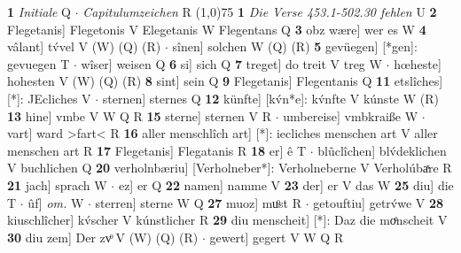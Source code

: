 \documentclass[8pt,a4paper,notitlepage]{article}
\begin{document}
\begin{table}[ht]
\begin{minipage}[t]{0.5\linewidth}
\textbf{1} \textit{Initiale} Q   $\cdot$ \textit{Capitulumzeichen} R  \newline
\line(1,0){75} \newline
\textbf{1} \textit{Die Verse 453.1-502.30 fehlen} U  \textbf{2} Flegetanis] Flegetonis V Elegetanis W Flegentans Q \textbf{3} obz wære] wer es W \textbf{4} vâlant] tv́vel V (W) (Q) (R)  $\cdot$ sînen] solchen W (Q) (R) \textbf{5} gevüegen] [*gen]: gevuegen T  $\cdot$ wîser] weisen Q \textbf{6} si] sich Q \textbf{7} treget] do treit V treg W  $\cdot$ hœheste] hohesten V (W) (Q) (R) \textbf{8} sint] sein Q \textbf{9} Flegetanis] Flegentanis Q \textbf{11} etslîches] [*]: JEcliches V  $\cdot$ sternen] sternes Q \textbf{12} künfte] [kv́n*e]: kv́nfte V kúnste W (R) \textbf{13} hine] vmbe V W Q R \textbf{15} sterne] sternen V R  $\cdot$ umbereise] vmbkraiße W  $\cdot$ vart] ward >fart< R \textbf{16} aller menschlîch art] [*]: iecliches menschen art V aller menschen art R \textbf{17} Flegetanis] Flegatanis R \textbf{18} er] ê T  $\cdot$ blûclîchen] blv́deklichen V buchlichen Q \textbf{20} verholnbæriu] [Verholneber*]: Verholneberne V Verholúbaͯre R \textbf{21} jach] sprach W  $\cdot$ ez] er Q \textbf{22} namen] namme V \textbf{23} der] er V das W \textbf{25} diu] die T  $\cdot$ ûf] \textit{om.} W  $\cdot$ sterren] sterne W Q \textbf{27} muoz] muͦst R  $\cdot$ getouftiu] getrv́we V \textbf{28} kiuschlîcher] kv́scher V kúnstlicher R \textbf{29} diu menscheit] [*]: Daz die moͤnscheit V \textbf{30} diu zem] Der zvͦ V (W) (Q) (R)  $\cdot$ gewert] gegert V W Q R \newline
\end{minipage}
\end{table}
\end{document}
